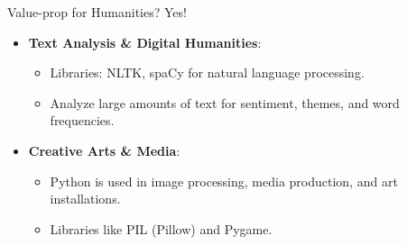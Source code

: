 \documentclass[
  ignorenonframetext,
]{beamer}
\providecommand{\tightlist}{%
  \setlength{\itemsep}{0pt}\setlength{\parskip}{0pt}}
\begin{document}
\begin{frame}{Value-prop for Humanities?}
\label{value-prop-for-humanities}
Yes!

\begin{itemize}
\tightlist
\item
  \textbf{Text Analysis \& Digital Humanities}:

  \begin{itemize}
  \tightlist
  \item
    Libraries: NLTK, spaCy for natural language processing.
  \item
    Analyze large amounts of text for sentiment, themes, and word
    frequencies.
  \end{itemize}

  \vspace{.5cm}
\item
  \textbf{Creative Arts \& Media}:

  \begin{itemize}
  \tightlist
  \item
    Python is used in image processing, media production, and art
    installations.
  \item
    Libraries like PIL (Pillow) and Pygame.
  \end{itemize}
\end{itemize}
\end{frame}
\end{document}

